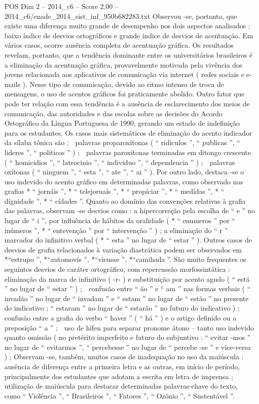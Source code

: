 \begin{textsample}{POS Dim 2 – 2014\_c6 – Score 2.00 – 2014\_c6/enade\_2014\_sist\_inf\_950b682283.txt}
Observou -se, portanto, que existe uma diferença muito grande de desempenho nos dois aspectos analisados : baixo índice de desvios ortográficos e grande índice de desvios de acentuação.
Em vários casos, ocorre ausência completa de acentuação gráfica.
Os resultados revelam, portanto, que a tendência dominante entre os universitários brasileiros é a eliminação da acentuação gráfica, provavelmente motivada pela vivência dos jovens relacionada aos aplicativos de comunicação via internet ( redes sociais e e-mails ).
Nesse tipo de comunicação, devido ao ritmo intenso de troca de mensagens, o uso de acentos gráficos foi praticamente abolido.
Outro fator que pode ter relação com essa tendência é a ausência de esclarecimento dos meios de comunicação, das autoridades e das escolas sobre as decisões do Acordo Ortográfico da Língua Portuguesa de 1990, gerando um estado de indefinição para os estudantes.
Os casos mais sistemáticos de eliminação do acento indicador da sílaba tônica são :  palavras proparoxítonas ( “ ridiculos ”, “ publicas ”, “ lideres ”, “ politicos ” ) ;  palavras paroxítonas terminadas em ditongo crescente ( “ homicidios ”, “ latrocinio ”, “ individuo ”, “ dependencia ” ) ;  palavras oxítonas ( “ ninguem ”, “ esta ”, “ ate ”, “ ai ” ).
Por outro lado, destaca -se o uso indevido do acento gráfico em determinadas palavras, como observado nas grafias * “ jornáis ”, * “ telejornaís ”, * “ propíciar ”, * “ medídas ”, * “ dígnidade ”, * “ cídades ”.
Quanto ao domínio das convenções relativas à grafia das palavras, observam -se desvios como : a hipercorreção pela escolha de “ e ” no lugar de “ i ”, por influência de hábitos da oralidade ( * “ enumeros ” por “ inúmeros ”, * “ entevenção ” por “ intervenção ” ) ; a eliminação do “ r ” marcador do infinitivo verbal ( * “ esta ” no lugar de “ estar ” ).
Outros casos de desvios de grafia relacionados à variação diastrática podem ser observados em *“estrupo ”, *“automovís ”, *“viensse ”, *“camihada ”.
São muito frequentes os seguintes desvios de caráter ortográfico, com repercussão morfossintática :  eliminação da marca de infinitivo ( -r- ) e substituição por acento agudo ( “ está ” no lugar de “ estar ” ) ;  confusão entre “ ão ” e “ am ” nas formas verbais ( “ invadão ” no lugar de “ invadam ” e “ estam ” no lugar de “ estão ” no presente do indicativo ; “ estaram ” no lugar de “ estarão ” no futuro do indicativo ) ;  confusão entre a grafia do verbo “ haver ” ( “ há ” ) e o artigo definido ou a preposição “ a ” ;  uso de hífen para separar pronome átono – tanto uso indevido quanto omissão ( no pretérito imperfeito e futuro do subjuntivo : “ evitar -mos ” no lugar de “ evitarmos ”, “ percebesse ” no lugar de “ percebe -se ” e vice-versa ) ; Observam -se, também, muitos casos de inadequação no uso da maiúscula : ausência de diferença entre a primeira letra e as outras, em início de período, principalmente dos estudantes que adotam a escrita em letra de imprensa ; utilização de maiúscula para destacar determinadas palavras-chave do texto, como “ Violência ”, “ Brasileiros ”, “ Fatores ”, “ Ozônio ”, “ Sustentável ”.

\end{textsample}

